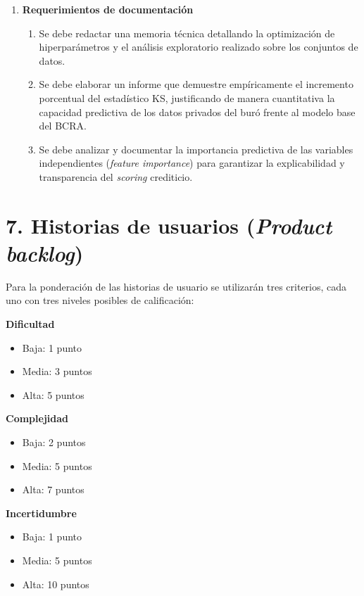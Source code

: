 \documentclass[
11pt, %
codirector, %
]{charter}
\begin{document}
\begin{enumerate}
    \item \textbf{Requerimientos de documentación}
    \begin{enumerate}
        \item Se debe redactar una memoria técnica detallando la optimización de hiperparámetros y el análisis exploratorio realizado sobre los conjuntos de datos.
        \item Se debe elaborar un informe que demuestre empíricamente el incremento porcentual del estadístico KS, justificando de manera cuantitativa la capacidad predictiva de los datos privados del buró frente al modelo base del BCRA.
        \item Se debe analizar y documentar la importancia predictiva de las variables independientes (\textit{feature importance}) para garantizar la explicabilidad y transparencia del \textit{scoring} crediticio.
    \end{enumerate}

\end{enumerate}

\section{7. Historias de usuarios (\textit{Product backlog})}
\label{sec:backlog}

Para la ponderación de las historias de usuario se utilizarán tres criterios, cada uno con tres niveles posibles de calificación:

\textbf{Dificultad}
\begin{itemize}
    \item Baja: 1 punto
    \item Media: 3 puntos
    \item Alta: 5 puntos
\end{itemize}

\textbf{Complejidad}
\begin{itemize}
    \item Baja: 2 puntos
    \item Media: 5 puntos
    \item Alta: 7 puntos
\end{itemize}

\textbf{Incertidumbre}
\begin{itemize}
    \item Baja: 1 punto
    \item Media: 5 puntos
    \item Alta: 10 puntos
\end{itemize}
\end{document}

